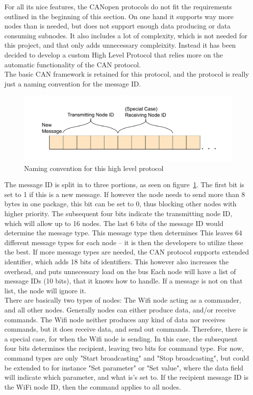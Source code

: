 For all its nice features, the CANopen protocols do not fit the requirements outlined in the beginning of this section. 
On one hand it supports way more nodes than is needed, but does not support enough data producing or data consuming subnodes.
It also includes a lot of complexity, which is not needed for this project, and that only adds unnecessary compleixity. 
Instead it has been decided to develop a custom High Level Protocol that relies more on the automatic functionality of the CAN protocol.\\

The basic CAN framework is retained for this protocol, and the protocol is really just a naming convention for the message ID. 

\begin{figure}[h!]
	\centering
	\includegraphics[width = 0.9\linewidth]{graphics/CAN_protocol_general_pdf}
	\caption{Naming convention for this high level protocol}
	\label{fig:CAN_protocol_general_pdf}
\end{figure}

The message ID is split in to three portions, as seen on figure~\ref{fig:CAN_protocol_general_pdf}.
The first bit is set to 1 if this is a new message.
If however the node needs to send more than 8 bytes in one package, this bit can be set to 0, thus blocking other nodes with higher priority.
The subsequent four bits indicate the transmitting node ID, which will allow up to 16 nodes. 
The last 6 bits of the message ID would determine the message type.
This message type then determines 
This leaves 64 different message types for each node -- it is then the developers to utilize these the best. 
If more message types are needed, the CAN protocol supports extended identifier, which adds 18 bits of identifiers.
This however also increases the overhead, and puts unnecessary load on the bus
Each node will have a list of message IDs (10 bits), that it knows how to handle.
If a message is not on that list, the node will ignore it.\\

There are basically two types of nodes: The Wifi node acting as a commander, and all other nodes.
Generally nodes can either produce data, and/or receive commands.
The Wifi node neither produces any kind of data nor receives commands, but it does receive data, and send out commands.
Therefore, there is a special case, for when the Wifi node is sending.
In this case, the subsequent four bits determines the recipient, leaving two bits for command type. 
For now, command types are only "Start broadcasting" and "Stop broadcasting", but could be extended to for instance "Set parameter" or "Set value", where the data field will indicate which parameter, and what is's set to.
If the recipient message ID is the WiFi node ID, then the command applies to all nodes.\\

